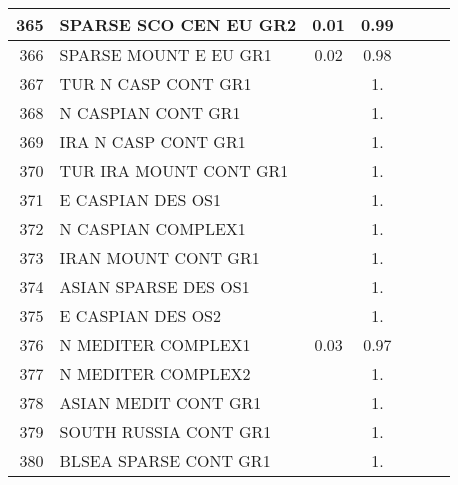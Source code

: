 {{\begin{tabular}{||r|l||c|c|c|c|c||}
 \hline
         365  & SPARSE SCO CEN EU GR2                                        &  0.01 &  0.99 &       &       \\
 \hline
         366  & SPARSE MOUNT E EU GR1                                        &  0.02 &  0.98 &       &       \\
 \hline
         367  & TUR N CASP CONT GR1                                          &       &  1.   &       &       \\
 \hline
         368  & N CASPIAN CONT GR1                                           &       &  1.   &       &       \\
 \hline
         369  & IRA N CASP CONT GR1                                          &       &  1.   &       &       \\
 \hline
         370  & TUR IRA MOUNT CONT GR1                                       &       &  1.   &       &       \\
 \hline
         371  & E CASPIAN DES OS1                                            &       &  1.   &       &       \\
 \hline
         372  & N CASPIAN COMPLEX1                                           &       &  1.   &       &       \\
 \hline
         373  & IRAN MOUNT CONT GR1                                          &       &  1.   &       &       \\
 \hline
         374  & ASIAN SPARSE DES OS1                                         &       &  1.   &       &       \\
 \hline
         375  & E CASPIAN DES OS2                                            &       &  1.   &       &       \\
 \hline
         376  & N MEDITER COMPLEX1                                           &  0.03 &  0.97 &       &       \\
 \hline
         377  & N MEDITER COMPLEX2                                           &       &  1.   &       &       \\
 \hline
         378  & ASIAN MEDIT CONT GR1                                         &       &  1.   &       &       \\
 \hline
         379  & SOUTH RUSSIA CONT GR1                                        &       &  1.   &       &       \\
 \hline
         380  & BLSEA SPARSE CONT GR1                                        &       &  1.   &       &       \\
 \hline
 \end{tabular}
}}
